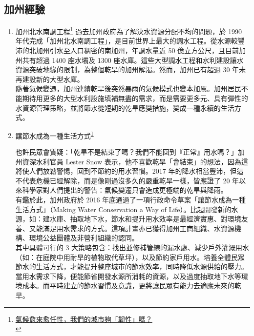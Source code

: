 \documentclass[a4paper,12pt]{article}
\begin{document}
\subsection{加州經驗}
\label{sec:org2edcd80}
\begin{enumerate}
\item 加州北水南調工程\footnote{\href{https://www.seinsights.asia/specialfeature/5065/5094}{氣候愈來愈任性，我們的城市夠「韌性」嗎？}\\\label{orgae83447}}
\label{sec:orgb8d259c}
過去加州政府為了解決水資源分配不均的問題，於 1990 年代完成「加州北水南調工程」，是目前世界上最大的調水工程。從水源較豐沛的北加州引水至人口稠密的南加州，年調水量近 50 億立方公尺，且目前加州共有超過 1400 座水壩及 1300 座水庫。這些大型調水工程和水利建設讓水資源突破地緣的限制，為整個乾旱的加州解渴。然而，加州已有超過 30 年未再建設新的大型水庫。\\

隨著氣候變遷，加州連續乾旱後突然暴雨的氣候模式也變本加厲。加州居民不能期待用更多的大型水利設施填補無盡的需求，而是需要更多元、具有彈性的水資源管理策略，並將節水從短期的乾旱應變措施，變成一種永續的生活方式。\\

\item 讓節水成為一種生活方式\textsuperscript{\ref{orgae83447}}
\label{sec:org804ab95}

也許民眾會質疑：「乾旱不是結束了嗎？我們不能回到『正常』用水嗎？」加州資深水利官員 Lester Snow 表示，他不喜歡乾旱「會結束」的想法，因為這將使人們放鬆警惕，回到不節約的用水習慣。2017 年的降水相當豐沛，但這不代表危機已經解除，而是像剛過沒多久的嚴重乾旱一樣，皆應證了 20 年以來科學家對人們提出的警告：氣候變遷只會造成更極端的乾旱與降雨。\\

有鑑於此，加州政府於 2016 年底通過了一項行政命令草案「讓節水成為一種生活方式」（Making Water Conservation a Way of Life）。比起開發新的水源，如：建水庫、抽取地下水，節水和提升用水效率是最經濟實惠、對環境友善、又能滿足用水需求的方式。這項計畫亦已獲得加州工商組織、水資源機構、環境公益團體及非營利組織的認同。\\

其中具體可行的 3 大策略包含：找出並修補管線的漏水處、減少戶外灌溉用水（如：在庭院中用耐旱的植物取代草坪），以及節約家戶用水。培養全體民眾節水的生活方式，才能提升整座城市的節水效率，同時降低水源供給的壓力。當用水需求下降，便能節省開發水源所消耗的資源，以及過度抽取地下水等環境成本。而平時建立的節水習慣及意識，更將讓民眾有能力去適應未來的乾旱。\\


\end{enumerate}
\end{document}
